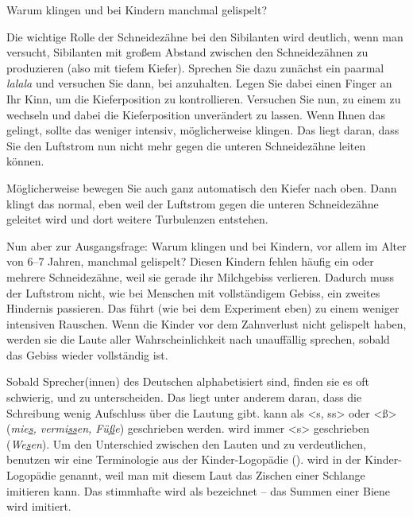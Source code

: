 \begin{Exkurs}{Warum klingen \textipa{[s]} und \textipa{[z]} bei Kindern manchmal gelispelt?}
\label{Exkursgelispeltess}

\noindent Die wichtige Rolle der Schneidezähne bei den Sibilanten wird deutlich, wenn man versucht, Sibilanten mit großem Abstand zwischen den Schneidezähnen zu produzieren (also mit tiefem Kiefer). Sprechen Sie dazu zunächst ein paarmal \textit{lalala} und versuchen Sie dann, bei \textipa{[l]} anzuhalten. Legen Sie dabei einen Finger an Ihr Kinn, um die Kieferposition zu kontrollieren. Versuchen Sie nun, zu einem \textipa{[s]} zu wechseln und dabei die Kieferposition unverändert zu lassen. Wenn Ihnen das gelingt, sollte das \textipa{[s]} weniger intensiv, möglicherweise  klingen. Das liegt daran, dass Sie den Luftstrom nun nicht mehr gegen die unteren Schneidezähne leiten können.

Möglicherweise bewegen Sie auch ganz automatisch den Kiefer nach oben. Dann klingt das \textipa{[s]} normal, eben weil der Luftstrom gegen die unteren Schneidezähne geleitet wird und dort weitere Turbulenzen entstehen.

Nun aber zur Ausgangsfrage: Warum klingen \textipa{[s]} und \textipa{[z]} bei Kindern, vor allem im Alter von 6--7 Jahren, manchmal gelispelt? Diesen Kindern fehlen häufig ein oder mehrere Schneidezähne, weil sie gerade ihr Milchgebiss verlieren. Dadurch muss der Luftstrom nicht, wie bei Menschen mit vollständigem Gebiss, ein zweites Hindernis passieren. Das führt (wie bei dem Experiment eben) zu einem weniger intensiven Rauschen. Wenn die Kinder vor dem Zahnverlust nicht gelispelt haben, werden sie die Laute aller Wahrscheinlichkeit nach unauffällig sprechen, sobald das Gebiss wieder vollständig ist.
\end{Exkurs}

\largerpage
Sobald Sprecher(innen) des Deutschen alphabetisiert sind, finden sie es oft schwierig, \textipa{[s]} und \textipa{[z]} zu unterscheiden. Das liegt unter anderem daran, dass die Schreibung wenig Aufschluss über die Lautung gibt. \textipa{[s]} kann als <s, ss> oder <ß> (\textit{mie\underline{s}, vermi\underline{ss}en, Fü\underline{ß}e}) geschrieben werden. \textipa{[z]} wird immer <s> geschrieben (\textit{We\underline{s}en}). Um den Unterschied zwischen den Lauten \textipa{[s]} und \textipa{[z]} zu verdeutlichen, benutzen wir eine Terminologie aus der Kinder-Logopädie (\zB \cite[45ff]{FoxBoyeretal2015}). \textipa{[s]} wird in der Kinder-Logopädie  genannt, weil man mit diesem Laut das Zischen einer Schlange imitieren kann. Das stimmhafte \textipa{[z]} wird als  bezeichnet -- das Summen einer Biene wird imitiert.  

